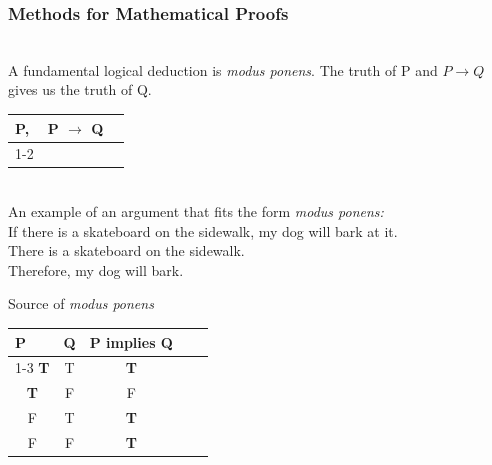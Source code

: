 \documentclass[aspectratio=169]{beamer}
\numberwithin{equation}{section}
\begin{document}
\begin{frame}
\frametitle{Methods for Mathematical Proofs}

\ \\A fundamental logical deduction is \emph{modus ponens}.  The truth of P and $P \rightarrow Q$ gives us the truth of Q. \pause

\begin{table}[]
\begin{tabular}{ccl}
\multicolumn{1}{l}{P,} & \multicolumn{1}{l}{P $\rightarrow$ Q} &  \\ \cline{1-2}
\multicolumn{2}{c}{Q}                                    &  \\
\end{tabular}
\end{table} \pause

\ \\An example of an argument that fits the form \emph{modus ponens:} \pause
\ \\If there is a skateboard on the sidewalk, my dog will bark at it.
\ \\There is a skateboard on the sidewalk.\pause
\ \\Therefore, my dog will bark.

\end{frame}

\begin{frame}{Source of \emph{modus ponens}}

\begin{table}[]
\begin{tabular}{cccll}
\multicolumn{1}{l}{P} & \multicolumn{1}{l}{Q} & \multicolumn{1}{l}{P implies Q} &  &  \\ \cline{1-3}
\textbf{T}                     & T                     & \textbf{T}                              &  &  \\
\textbf{T}                     & F                     & F                               &  &  \\
F                     & T                     & \textbf{T}                                &  &  \\
F                     & F                     & \textbf{T}                               &  & 
\end{tabular}
\end{table} 

\end{frame}
\end{document}
